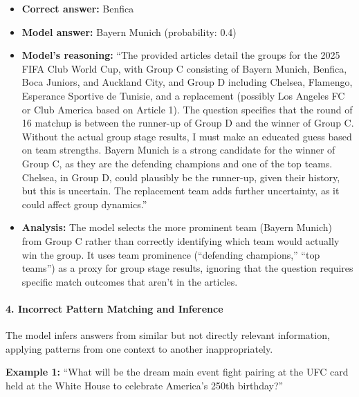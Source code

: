 \begin{itemize}
\item \textbf{Correct answer:} Benfica
\item \textbf{Model answer:} Bayern Munich (probability: 0.4)
\item \textbf{Model's reasoning:} ``The provided articles detail the groups for the 2025 FIFA Club World Cup, with Group C consisting of Bayern Munich, Benfica, Boca Juniors, and Auckland City, and Group D including Chelsea, Flamengo, Esperance Sportive de Tunisie, and a replacement (possibly Los Angeles FC or Club America based on Article 1). The question specifies that the round of 16 matchup is between the runner-up of Group D and the winner of Group C. Without the actual group stage results, I must make an educated guess based on team strengths. Bayern Munich is a strong candidate for the winner of Group C, as they are the defending champions and one of the top teams. Chelsea, in Group D, could plausibly be the runner-up, given their history, but this is uncertain. The replacement team adds further uncertainty, as it could affect group dynamics.''
\item \textbf{Analysis:} The model selects the more prominent team (Bayern Munich) from Group C rather than correctly identifying which team would actually win the group. It uses team prominence (``defending champions,'' ``top teams'') as a proxy for group stage results, ignoring that the question requires specific match outcomes that aren't in the articles.
\end{itemize}

\paragraph{4. Incorrect Pattern Matching and Inference}

The model infers answers from similar but not directly relevant information, applying patterns from one context to another inappropriately.

\textbf{Example 1:} ``What will be the dream main event fight pairing at the UFC card held at the White House to celebrate America's 250th birthday?''

